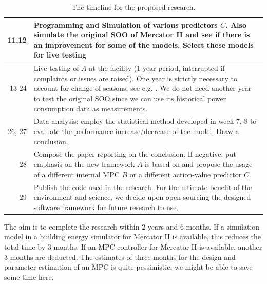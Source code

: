 \documentclass{article}
\theoremstyle{definition}
\theoremstyle{remark}
\begin{document}
\begin{table}
\begin{tabular}{r|p{5in}}
\hline
11,12 & Programming and Simulation of various predictors $C$. Also simulate the original SOO of Mercator II and see if there is an improvement for some of the models. Select these models for live testing \\
\hline
13-24 & Live testing of $A$ at the facility (1 year period, interrupted if complaints or issues are raised). One year is strictly necessary to account for change of seasons, see e.g. \cite{luo2022controlling}. We do not need another year to test the original SOO since we can use its historical power consumption data as measurements.\\
\hline
26, 27 & Data analysis: employ the statistical method developed in week 7, 8 to evaluate the performance increase/decrease of the model. Draw a conclusion. \\
\hline
28 & Compose the paper reporting on the conclusion. If negative, put emphasis on the new framework $A$ is based on and propose the usage of a different internal MPC $B$ or a different action-value predictor $C$.\\
\hline
29 & Publish the code used in the research. For the ultimate benefit of the environment and science, we decide upon open-sourcing the designed software framework for future research to use.\\

\end{tabular}
\caption{The timeline for the proposed research.}
\end{table}

The aim is to complete the research within 2 years and 6 months. If a simulation model in a building energy simulator for Mercator II is available, this reduces the total time by 3 months. If an MPC controller for Mercator II is available, another 3 months are deducted. The estimates of three months for the design and parameter estimation of an MPC is quite pessimistic; we might be able to save some time here.


\begin{multicols}{2}
    


\end{multicols}
\end{document}
